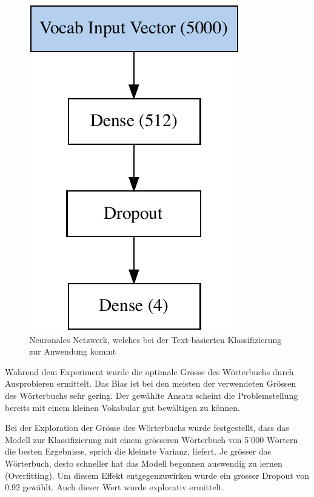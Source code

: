 \begin{figure}[h!]
    \captionsetup{width=.9\linewidth}
    \caption{Neuronales Netzwerk, welches bei der Text-basierten Klassifizierung zur Anwendung kommt}
    \label{text-classification-model}
    \centering
    \includegraphics[scale=0.6]{graphics/text-classification/model.pdf}
\end{figure} 

Während dem Experiment wurde die optimale Grösse des Wörterbuchs durch Ausprobieren ermittelt. Das Bias ist bei den meisten der verwendeten Grössen des Wörterbuchs sehr gering. Der gewählte Ansatz scheint die Problemstellung bereits mit einem kleinen Vokabular gut bewältigen zu können.

Bei der Exploration der Grösse des Wörterbuchs wurde festgestellt, dass das Modell zur Klassifizierung mit einem grösseren Wörterbuch von 5'000 Wörtern die besten Ergebnisse, sprich die kleinste Varianz, liefert. Je grösser das Wörterbuch, desto schneller hat das Modell begonnen auswendig zu lernen (Overfitting). Um diesem Effekt entgegenzuwirken wurde ein grosser Dropout von 0.92 gewählt. Auch dieser Wert wurde explorativ ermittelt.

